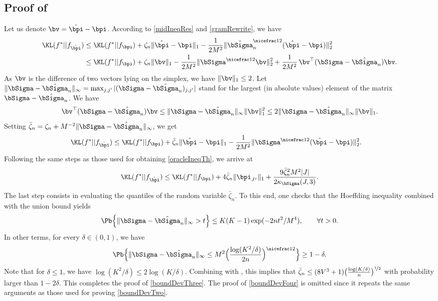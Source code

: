 \subsection{Proof of }
\label{ssec:proof:smallK}
Let us denote $\bv = \hat\bpi - \bpi$. According to \eqref{midIneqRes} and \eqref{gramRewrite},
we have
\begin{align}
\KL(f^*|| f_{\hat\bpi})
        &\leq \KL(f^*|| f_{\bpi})+ \zeta_n\|\hat\bpi - \bpi \|_1-
                \frac{1}{2M^2}\|\hat\bSigma_n^{\nicefrac12}(\hat\bpi-\bpi)\|_2^2\\
        &\leq \KL(f^*|| f_{\bpi})+ \zeta_n\|\bv\|_1-\frac{1}{2M^2}\|\bSigma^{\nicefrac12}\bv\|_2^2+
                \frac{1}{2M^2}\,\bv^\top(\bSigma-\hat\bSigma_n)\bv.
        \label{midIneqResTwo}
\end{align}
As $\bv$ is the difference of two vectors lying on the simplex, we have $\|\bv\|_1\le 2$. Let
$\|\bSigma-\hat\bSigma_n\|_\infty = \max_{j,j'}|(\bSigma-\hat\bSigma_n)_{j,j'}|$ stand for the
largest (in absolute values) element of the matrix $\bSigma-\hat\bSigma_n$. We have
\begin{equation}
\bv^\top(\bSigma-\hat\bSigma_n)\bv \le \|\bSigma-\hat\bSigma_n\|_{\infty} \|\bv\|_1^2
\le 2\|\bSigma-\hat\bSigma_n\|_{\infty} \|\bv\|_1.
\end{equation}
Setting $\bar\zeta_n = \zeta_n + M^{-2}\|\bSigma-\hat\bSigma_n\|_{\infty}$, we get
\begin{align}
\KL(f^*|| f_{\hat\bpi})
        &\leq \KL(f^*|| f_{\bpi})+ \bar\zeta_n\|\hat\bpi - \bpi \|_1-
                \frac{1}{2M^2}\|\bSigma^{\nicefrac12}(\hat\bpi-\bpi)\|_2^2.
                \label{midIneqResThree}
\end{align}
Following the same steps as those used for obtaining \eqref{oracleIneqTh}, we arrive at
\begin{equation}
\label{oracleIneqThTwo}
  \KL(f^*|| f_{\hat\bpi}) \leq \KL(f^*|| f_{\bpi}) + 4\bar\zeta_n\| \bpi_{J^c}\|_1 +
  \frac{9\bar\zeta_n^2M^2|J|}{2\kappa_{\bSigma}(J,3)}.
\end{equation}
The last step consists in evaluating the quantiles of the random variable $\bar\zeta_n$.
To this end, one checks that the Hoeffding inequality combined with the union bound yields
\begin{equation}
\Pb\Big\{\|\bSigma-\hat\bSigma_n\|_{\infty} >t\Big\} \le K(K-1) \exp({-2nt^2/M^4}),\qquad\forall t>0.
\end{equation}
In other terms, for every $\delta\in(0,1)$, we have
\begin{equation}
\Pb\Big\{\|\bSigma-\hat\bSigma_n\|_{\infty} \le M^2\Big(\frac{\log(K^2/\delta)}{2n}\Big)^{\nicefrac12} \Big\}
\ge 1-\delta.\label{SigmaInfty}
\end{equation}
Note that for $\delta\le 1$, we have $\log(K^2/\delta)\le 2\log(K/\delta)$. Combining with
, this implies that $\bar\zeta_n \le (8V^3+1)\big(\frac{\log(K/\delta)}{n}
\big)^{\nicefrac12}$ with probability larger than $1-2\delta$. This completes the proof of \eqref{boundDevThree}.
The proof of \eqref{boundDevFour} is omitted since it repeats the same arguments as those
used for proving \eqref{boundDevTwo}.



